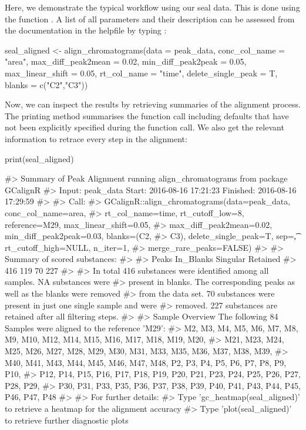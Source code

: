 Here, we demonstrate the typical workflow using our seal data. This is
done using the function . A list of all
parameters and their description can be assessed from the documentation
in the helpfile by typing :

\begin{Schunk}
\begin{Sinput}
seal_aligned <- align_chromatograms(data = peak_data,
                    conc_col_name = "area",
                    max_diff_peak2mean = 0.02,
                    min_diff_peak2peak = 0.05,
                    max_linear_shift = 0.05,
                    rt_col_name = "time",
                    delete_single_peak = T,
                    blanks = c("C2","C3"))
\end{Sinput}
\end{Schunk}

Now, we can inspect the results by retrieving summaries of the alignment
process. The printing method summarises the function call including
defaults that have not been explicitly specified during the function
call. We also get the relevant information to retrace every step in the
alignment:

\begin{Schunk}
\begin{Sinput}
print(seal_aligned)
\end{Sinput}
\begin{Soutput}
#>   Summary of Peak Alignment running align_chromatograms from package GCalignR
#>   Input: peak_data   Start:  2016-08-16 17:21:23     Finished:  2016-08-16 17:29:59 
#> 
#> Call:
#>   GCalignR::align_chromatograms(data=peak_data, conc_col_name=area,
#>   rt_col_name=time, rt_cutoff_low=8, reference=M29, max_linear_shift=0.05,
#>   max_diff_peak2mean=0.02, min_diff_peak2peak=0.03, blanks=(C2,
#>   C3), delete_single_peak=T, sep=\t, rt_cutoff_high=NULL, n_iter=1,
#>   merge_rare_peaks=FALSE)
#> 
#> Summary of scored substances:
#> 
#>     Peaks In_Blanks  Singular  Retained 
#>       416       119        70       227 
#> 
#>   In total 416 substances were identified among all samples. NA substances were
#>   present in blanks. The corresponding peaks as well as the blanks were removed
#>   from the data set. 70 substances were present in just one single sample and were
#>   removed. 227 substances are retained after all filtering steps.
#> 
#> Sample Overview  The following 84 Samples were aligned to the reference 'M29':
#>   M2, M3, M4, M5, M6, M7, M8, M9, M10, M12, M14, M15, M16, M17, M18, M19, M20,
#>   M21, M23, M24, M25, M26, M27, M28, M29, M30, M31, M33, M35, M36, M37, M38, M39,
#>   M40, M41, M43, M44, M45, M46, M47, M48, P2, P3, P4, P5, P6, P7, P8, P9, P10,
#>   P12, P14, P15, P16, P17, P18, P19, P20, P21, P23, P24, P25, P26, P27, P28, P29,
#>   P30, P31, P33, P35, P36, P37, P38, P39, P40, P41, P43, P44, P45, P46, P47, P48
#> 
#> For further details:
#>   Type 'gc_heatmap(seal_aligned)' to retrieve a heatmap for the alignment accuracy
#>   Type 'plot(seal_aligned)' to retrieve further diagnostic plots
\end{Soutput}
\end{Schunk}

